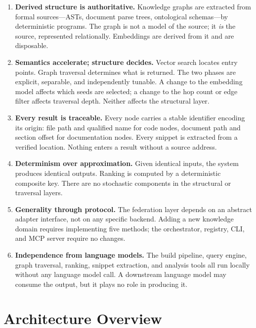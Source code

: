 \documentclass[10pt]{article}
\begin{document}
\begin{enumerate}

\item \textbf{Derived structure is authoritative.}
  Knowledge graphs are extracted from formal sources---ASTs, document parse
  trees, ontological schemas---by deterministic programs. The graph is not a
  model of the source; it \emph{is} the source, represented relationally.
  Embeddings are derived from it and are disposable.

\item \textbf{Semantics accelerate; structure decides.}
  Vector search locates entry points. Graph traversal determines what is
  returned. The two phases are explicit, separable, and independently tunable.
  A change to the embedding model affects which seeds are selected; a change to
  the hop count or edge filter affects traversal depth. Neither affects the
  structural layer.

\item \textbf{Every result is traceable.}
  Every node carries a stable identifier encoding its origin: file path and
  qualified name for code nodes, document path and section offset for
  documentation nodes. Every snippet is extracted from a verified location.
  Nothing enters a result without a source address.

\item \textbf{Determinism over approximation.}
  Given identical inputs, the system produces identical outputs. Ranking is
  computed by a deterministic composite key. There are no stochastic components
  in the structural or traversal layers.

\item \textbf{Generality through protocol.}
  The federation layer depends on an abstract adapter interface, not on any
  specific backend. Adding a new knowledge domain requires implementing five
  methods; the orchestrator, registry, CLI, and MCP server require no changes.

\item \textbf{Independence from language models.}
  The build pipeline, query engine, graph traversal, ranking, snippet
  extraction, and analysis tools all run locally without any language model
  call. A downstream language model may consume the output, but it plays no
  role in producing it.

\end{enumerate}

\section{Architecture Overview}
\end{document}
